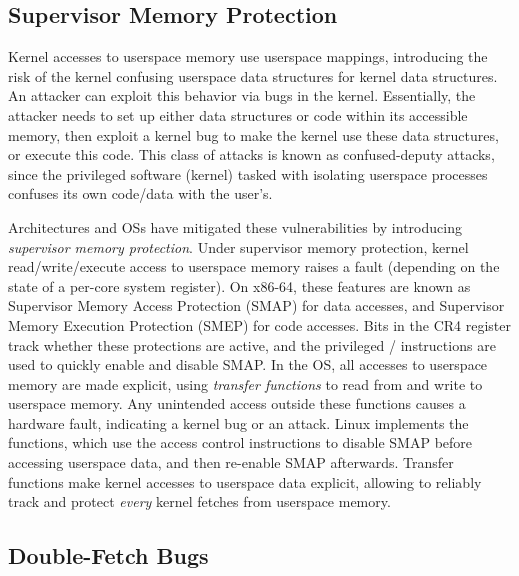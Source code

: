 \subsection{Supervisor Memory Protection} %

Kernel accesses to userspace memory use userspace mappings, introducing
the risk of the kernel confusing userspace data structures
for kernel data structures.
An attacker can exploit this behavior via bugs in the
kernel.
Essentially, the attacker needs to set up either data structures
or code within its accessible memory, then exploit a kernel
bug to make the kernel use these data structures, or execute
this code.
This class of attacks is known as confused-deputy attacks, since the
privileged software (kernel) tasked with isolating userspace processes
confuses its own code/data with the user's.

Architectures and OSs have mitigated these vulnerabilities
by introducing \emph{supervisor memory protection}.
Under supervisor memory protection, kernel read/write/execute access to 
userspace memory raises a fault (depending on the state of a per-core system
register).
On x86-64, these features are known as Supervisor Memory Access
Protection (SMAP) for data accesses, and Supervisor Memory Execution
Protection (SMEP) for code accesses. 
Bits in the CR4 register track whether these protections are active, 
and the privileged / instructions are used to 
quickly enable and disable SMAP.
In the OS, all accesses to userspace memory are made explicit,
using \emph{transfer functions} to read from and write to userspace memory.
Any unintended access outside these functions causes a
hardware fault, indicating a kernel bug or an attack.
Linux implements the  functions, which
use the access control instructions to disable SMAP before
accessing userspace data, and then re-enable SMAP afterwards.  
Transfer functions make
kernel accesses to userspace data explicit, allowing
\midas to reliably track and protect \emph{every} kernel fetches 
from userspace memory.

\subsection{Double-Fetch Bugs}

